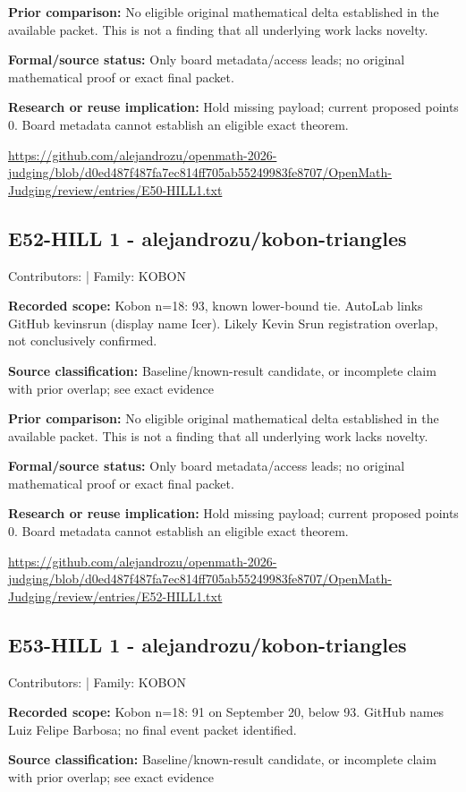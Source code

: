 \documentclass[11pt,a4paper]{article}
\begin{document}
\textbf{Prior comparison:} No eligible original mathematical delta established in the available packet. This is not a finding that all underlying work lacks novelty.

\textbf{Formal/source status:} Only board metadata/access leads; no original mathematical proof or exact final packet. 

\textbf{Research or reuse implication:} Hold missing payload; current proposed points 0. Board metadata cannot establish an eligible exact theorem.

{\small \url{https://github.com/alejandrozu/openmath-2026-judging/blob/d0ed487f487fa7ec814ff705ab55249983fe8707/OpenMath-Judging/review/entries/E50-HILL1.txt}\par}

\begin{samepage}
\subsection{E52-HILL 1  -  alejandrozu/kobon-triangles}
{\small Contributors:  | Family: KOBON\par}

\textbf{Recorded scope:} Kobon n=18: 93, known lower-bound tie. AutoLab links GitHub kevinsrun (display name Icer). Likely Kevin Srun registration overlap, not conclusively confirmed.

\end{samepage}
\textbf{Source classification:} Baseline/known-result candidate, or incomplete claim with prior overlap; see exact evidence

\textbf{Prior comparison:} No eligible original mathematical delta established in the available packet. This is not a finding that all underlying work lacks novelty.

\textbf{Formal/source status:} Only board metadata/access leads; no original mathematical proof or exact final packet. 

\textbf{Research or reuse implication:} Hold missing payload; current proposed points 0. Board metadata cannot establish an eligible exact theorem.

{\small \url{https://github.com/alejandrozu/openmath-2026-judging/blob/d0ed487f487fa7ec814ff705ab55249983fe8707/OpenMath-Judging/review/entries/E52-HILL1.txt}\par}

\begin{samepage}
\subsection{E53-HILL 1  -  alejandrozu/kobon-triangles}
{\small Contributors:  | Family: KOBON\par}

\textbf{Recorded scope:} Kobon n=18: 91 on September 20, below 93. GitHub names Luiz Felipe Barbosa; no final event packet identified.

\end{samepage}
\textbf{Source classification:} Baseline/known-result candidate, or incomplete claim with prior overlap; see exact evidence
\end{document}
